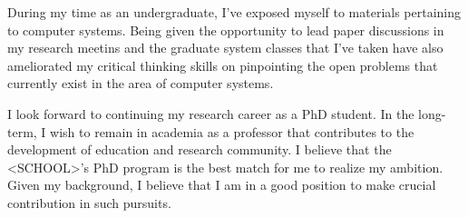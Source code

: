 \documentclass[12pt]{article}
\begin{document}
During my time as an undergraduate, I've exposed myself to materials pertaining to computer systems. Being given the opportunity to lead paper discussions in my research meetins and the graduate system classes that I've taken have also ameliorated my critical thinking skills on pinpointing the open problems that currently exist in the area of computer systems. \newline

I look forward to continuing my research career as a PhD student. In the long-term, I wish to remain in academia as a professor that contributes to the development of education and research community. I believe that the <SCHOOL>'s PhD program is the best match for me to realize my ambition. Given my background, I believe that I am in a good position to make crucial contribution in such pursuits. \newline



\end{document}
